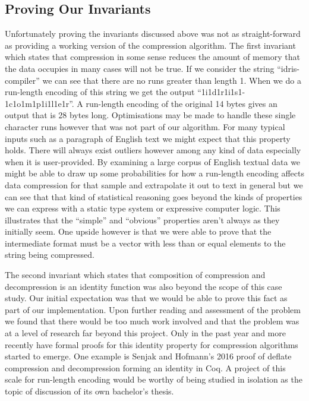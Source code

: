 \documentclass[a4paper, notitlepage]{report}
\begin{document}
\subsection{Proving Our Invariants}
\label{sec:org8b1d3c2}
Unfortunately proving the invariants discussed above was not as straight-forward
as providing a working version of the compression algorithm. The first invariant
which states that compression in some sense reduces the amount of memory that
the data occupies in many cases will not be true. If we consider the string
``idris-compiler'' we can see that there are no runs greater than length 1. When
we do a run-length encoding of this string we get the output
``1i1d1r1i1s1-1c1o1m1p1i1l1e1r''. A run-length encoding of the original 14 bytes
gives an output that is 28 bytes long. Optimisations may be made to handle these
single character runs however that was not part of our algorithm. For many
typical inputs such as a paragraph of English text we might expect that this
property holds. There will always exist outliers however among any kind of data
especially when it is user-provided. By examining a large corpus of English
textual data we might be able to draw up some probabilities for how a run-length
encoding affects data compression for that sample and extrapolate it out to text
in general but we can see that that kind of statistical reasoning goes beyond
the kinds of properties we can express with a static type system or expressive
computer logic. This illustrates that the ``simple'' and ``obvious'' properties
aren't always as they initially seem. One upside however is that we were able to
prove that the intermediate format must be a vector with less than or equal
elements to the string being compressed.

The second invariant which states that composition of compression and
decompression is an identity function was also beyond the scope of this case
study. Our initial expectation was that we would be able to prove this fact as
part of our implementation. Upon further reading and assessment of the problem
we found that there would be too much work involved and that the problem was at
a level of research far beyond this project. Only in the past year and more
recently have formal proofs for this identity property for compression
algorithms started to emerge. One example is Senjak and Hofmann's 2016 proof
\cite{senjak_deflate_2016} of deflate compression and decompression forming an
identity in Coq. A project of this scale for run-length encoding would be worthy
of being studied in isolation as the topic of discussion of its own bachelor's
thesis.
\end{document}
